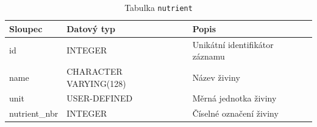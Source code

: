 \begin{table}[ht!]
    \centering
    \begin{tabularx}{\textwidth}{|l|l|L|}
        \hline
        \textbf{Sloupec} & \textbf{Datový typ}    & \textbf{Popis}                 \\ \hline
        id               & INTEGER                & Unikátní identifikátor záznamu \\ \hline
        name             & CHARACTER VARYING(128) & Název živiny                   \\ \hline
        unit             & USER-DEFINED           & Měrná jednotka živiny          \\ \hline
        nutrient\_nbr    & INTEGER                & Číselné označení živiny        \\ \hline
    \end{tabularx}
    \caption{Tabulka \texttt{nutrient}}
    \label{tab:nutrient}
\end{table}
